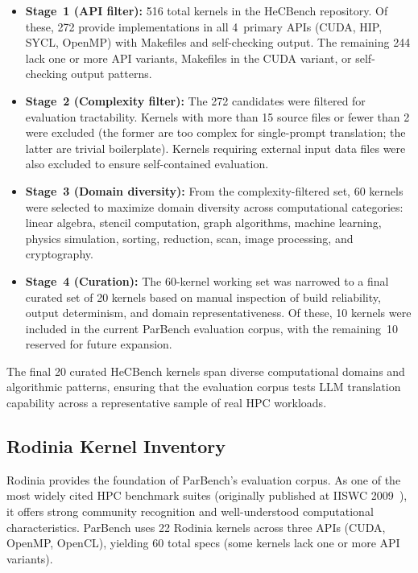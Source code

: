 \begin{itemize}
  \item \textbf{Stage~1 (API filter):} 516 total kernels in the HeCBench
    repository. Of these, 272 provide implementations in all 4~primary APIs
    (CUDA, HIP, SYCL, OpenMP) with Makefiles and self-checking output. The
    remaining 244 lack one or more API variants, Makefiles in the CUDA variant,
    or self-checking output patterns.

  \item \textbf{Stage~2 (Complexity filter):} The 272 candidates were filtered
    for evaluation tractability. Kernels with more than 15 source files or fewer
    than 2 were excluded (the former are too complex for single-prompt
    translation; the latter are trivial boilerplate). Kernels requiring external
    input data files were also excluded to ensure self-contained evaluation.

  \item \textbf{Stage~3 (Domain diversity):} From the complexity-filtered set,
    60 kernels were selected to maximize domain diversity across computational
    categories: linear algebra, stencil computation, graph algorithms, machine
    learning, physics simulation, sorting, reduction, scan, image processing,
    and cryptography.

  \item \textbf{Stage~4 (Curation):} The 60-kernel working set was narrowed to a
    final curated set of 20 kernels based on manual inspection of build
    reliability, output determinism, and domain representativeness. Of these, 10
    kernels were included in the current ParBench evaluation corpus, with the
    remaining~10 reserved for future expansion.
\end{itemize}

The final 20 curated HeCBench kernels span diverse computational domains and
algorithmic patterns, ensuring that the evaluation corpus tests LLM translation
capability across a representative sample of real HPC workloads.

\subsection{Rodinia Kernel Inventory}
\label{sec:appendix-b4}

Rodinia provides the foundation of ParBench's evaluation corpus. As one of the
most widely cited HPC benchmark suites (originally published at IISWC
2009~\cite{Rodinia2009}), it offers strong community recognition and
well-understood computational characteristics. ParBench uses 22 Rodinia kernels
across three APIs (CUDA, OpenMP, OpenCL), yielding 60 total specs (some kernels
lack one or more API variants).

